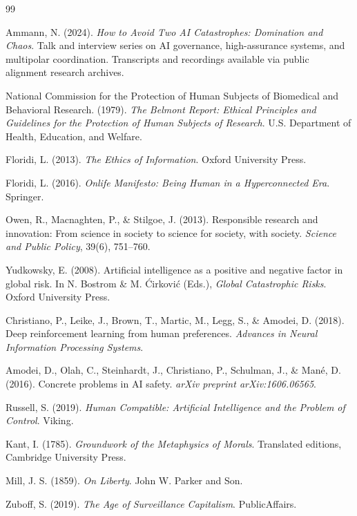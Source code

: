 \documentclass[11pt,oneside]{article}
\begin{document}
\newpage 
\begin{thebibliography}{99}

Ammann, N. (2024).
\textit{How to Avoid Two AI Catastrophes: Domination and Chaos}.
Talk and interview series on AI governance, high-assurance systems, and multipolar coordination.
Transcripts and recordings available via public alignment research archives.

National Commission for the Protection of Human Subjects of Biomedical and Behavioral Research. (1979).
\textit{The Belmont Report: Ethical Principles and Guidelines for the Protection of Human Subjects of Research}.
U.S. Department of Health, Education, and Welfare.

Floridi, L. (2013).
\textit{The Ethics of Information}.
Oxford University Press.

Floridi, L. (2016).
\textit{Onlife Manifesto: Being Human in a Hyperconnected Era}.
Springer.

Owen, R., Macnaghten, P., \& Stilgoe, J. (2013).
Responsible research and innovation: From science in society to science for society, with society.
\textit{Science and Public Policy}, 39(6), 751–760.

Yudkowsky, E. (2008).
Artificial intelligence as a positive and negative factor in global risk.
In N. Bostrom \& M. Ćirković (Eds.), \textit{Global Catastrophic Risks}.
Oxford University Press.

Christiano, P., Leike, J., Brown, T., Martic, M., Legg, S., \& Amodei, D. (2018).
Deep reinforcement learning from human preferences.
\textit{Advances in Neural Information Processing Systems}.

Amodei, D., Olah, C., Steinhardt, J., Christiano, P., Schulman, J., \& Mané, D. (2016).
Concrete problems in AI safety.
\textit{arXiv preprint arXiv:1606.06565}.

Russell, S. (2019).
\textit{Human Compatible: Artificial Intelligence and the Problem of Control}.
Viking.

Kant, I. (1785).
\textit{Groundwork of the Metaphysics of Morals}.
Translated editions, Cambridge University Press.

Mill, J. S. (1859).
\textit{On Liberty}.
John W. Parker and Son.

Zuboff, S. (2019).
\textit{The Age of Surveillance Capitalism}.
PublicAffairs.


\end{thebibliography}
\end{document}
